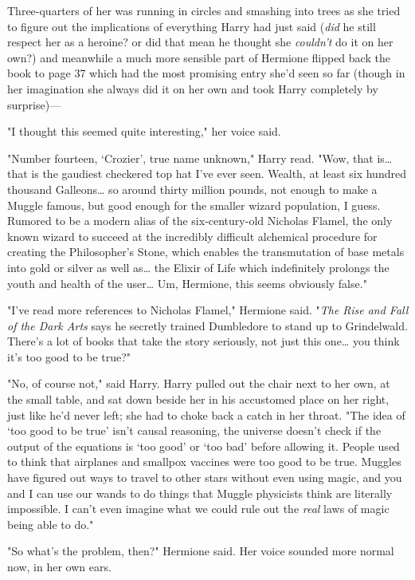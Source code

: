 Three-quarters of her was running in circles and smashing into trees as she 
tried to figure out the implications of everything Harry had just said 
(\emph{did} he still respect her as a heroine? or did that mean he thought she 
\emph{couldn't} do it on her own?) and meanwhile a much more sensible part of 
Hermione flipped back the book to page 37 which had the most promising entry 
she'd seen so far (though in her imagination she always did it on her own and 
took Harry completely by surprise)---

"I thought this seemed quite interesting," her voice said.

"Number fourteen, `Crozier', true name unknown," Harry read. "Wow, that 
is{\ldots} that is the gaudiest checkered top hat I've ever seen. Wealth, at 
least six hundred thousand Galleons{\ldots} so around thirty million pounds, 
not enough to make a Muggle famous, but good enough for the smaller wizard 
population, I guess. Rumored to be a modern alias of the six-century-old 
Nicholas Flamel, the only known wizard to succeed at the incredibly difficult 
alchemical procedure for creating the Philosopher's Stone, which enables the 
transmutation of base metals into gold or silver as well as{\ldots} the Elixir 
of Life which indefinitely prolongs the youth and health of the user{\ldots} 
Um, Hermione, this seems obviously false."

"I've read more references to Nicholas Flamel," Hermione said. "\emph{The Rise 
and Fall of the Dark Arts} says he secretly trained Dumbledore to stand up to 
Grindelwald. There's a lot of books that take the story seriously, not just 
this one{\ldots} you think it's too good to be true?"

"No, of course not," said Harry. Harry pulled out the chair next to her own, at 
the small table, and sat down beside her in his accustomed place on her right, 
just like he'd never left; she had to choke back a catch in her throat. "The 
idea of `too good to be true' isn't causal reasoning, the universe doesn't 
check if the output of the equations is `too good' or `too bad' before allowing 
it. People used to think that airplanes and smallpox vaccines were too good to 
be true. Muggles have figured out ways to travel to other stars without even 
using magic, and you and I can use our wands to do things that Muggle 
physicists think are literally impossible. I can't even imagine what we could 
rule out the \emph{real} laws of magic being able to do."

"So what's the problem, then?" Hermione said. Her voice sounded more normal 
now, in her own ears.


